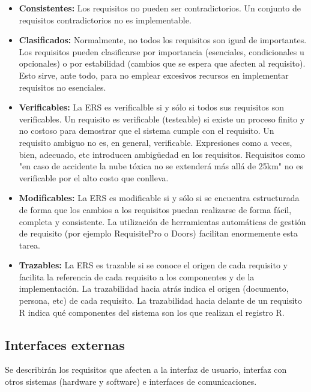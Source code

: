 \documentclass[12pt,a4paper, twosite]{article}
\begin{document}
\begin{itemize}
\begin{itemize}
\item \textbf{Consistentes:} Los requisitos no pueden ser contradictorios. Un
conjunto de requisitos contradictorios no es implementable.

\item \textbf{Clasificados:} Normalmente, no todos los requisitos son igual de
importantes. Los requisitos pueden clasificarse por importancia
(esenciales, condicionales u opcionales) o por estabilidad (cambios
que se espera que afecten al requisito). Esto sirve, ante todo,
para no emplear excesivos recursos en implementar requisitos no
esenciales.

\item \textbf{Verificables:} La ERS es verificalble si y sólo si todos sus
requisitos son verificables. Un requisito es verificable
(testeable) si existe un proceso finito y no costoso para
demostrar que el sistema cumple con el requisito. Un requisito
ambiguo no es, en general, verificable. Expresiones como a veces,
bien, adecuado, etc introducen ambigüedad en los
requisitos. Requisitos como "en caso de accidente la nube tóxica
no se extenderá más allá de 25km" no es verificable por el alto
costo que conlleva.

\item \textbf{Modificables:} La ERS es modificable si y sólo si se encuentra
estructurada de forma que los cambios a los requisitos puedan
realizarse de forma fácil, completa y consistente. La utilización
de herramientas automáticas de gestión de requisito (por ejemplo
RequisitePro o Doors) facilitan enormemente esta tarea.

\item \textbf{Trazables:} La ERS es trazable si se conoce el origen de cada
requisito y facilita la referencia de cada requisito a los
componentes y de la implementación. La trazabilidad hacia atrás
indica el origen (documento, persona, etc) de cada requisito. La
trazabilidad hacia delante de un requisito R indica qué
componentes del sistema son los que realizan el registro R.
\end{itemize}
\end{itemize}


\subsection{Interfaces externas}
\label{sec:orgfd5391f}

Se describirán los requisitos que afecten a la interfaz de usuario,
interfaz con otros sistemas (hardware y software) e interfaces de comunicaciones.
\end{document}

